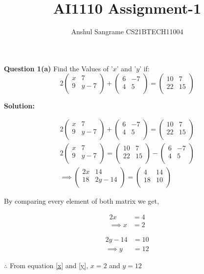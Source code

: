 \documentclass[journal,12pt,twocolumn]{IEEEtran}
\title{AI1110 Assignment-1}
\author{Anshul Sangrame CS21BTECH11004}
\newcommand{\myvec}[1]{\ensuremath{\begin{pmatrix}#1\end{pmatrix}}}
\newcommand{\solution}{\noindent \textbf{Solution: }}
\begin{document}
\maketitle

\noindent \textbf{Question 1(a)} Find the Values of '$x $' and '$y $' if: 
$$
2
\myvec{
x & 7 \\
9 & y-7 \\
}
+
\myvec{
6 & -7 \\
4 & 5 \\
}
=
\myvec{
10 & 7 \\
22 & 15 \\
}
$$

\solution


\begin{align}
2
\myvec{
x & 7 \\
9 & y-7 \\
}
+
\myvec{
6 & -7 \\
4 & 5 \\
}
=
\myvec{
10 & 7 \\
22 & 15 \\
}
\\
2
\myvec{
x & 7 \\
9 & y-7 \\
}
=
\myvec{
10 & 7 \\
22 & 15 \\
}
-
\myvec{
6 & -7 \\
4 & 5 \\
}
\\
\implies
\myvec{
2x & 14 \\
18 & 2y-14 \\
}
=
\myvec{
4 & 14\\
18 & 10\\
}
\end{align}


\noindent By comparing every element of both matrix we get,

\begin{align}
2x &= 4\\
\label{x}
\implies
x &= 2
\end{align}

\begin{align}
2y-14 &= 10\\
\label{y}
\implies
y &= 12
\end{align}


\noindent $ \therefore$ From equation \ref{x} and \ref{y},  $x = 2$ and $y=12 $
\end{document}
